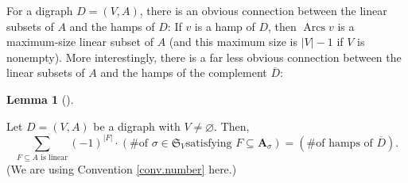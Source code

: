 \documentclass[numbers=enddot,12pt,final,onecolumn,notitlepage]{scrartcl}%
\numberwithin{exer}{section}
\theoremstyle{definition}
\newtheorem{lem}[theo]{Lemma}
\newenvironment{lemma}[1][]
{\begin{lem}[#1]\begin{leftbar}}
{\end{leftbar}\end{lem}}
\let\sumnonlimits\sum
\renewcommand{\sum}{\sumnonlimits\limits}
\begin{document}
For a digraph $D=\left(  V,A\right)  $, there is an obvious connection between
the linear subsets of $A$ and the hamps of $D$: If $v$ is a hamp of $D$, then
$\operatorname*{Arcs}v$ is a maximum-size linear subset of $A$ (and this
maximum size is $\left\vert V\right\vert -1$ if $V$ is nonempty). More
interestingly, there is a far less obvious connection between the linear
subsets of $A$ and the hamps of the complement $\overline{D}$:

\begin{lemma}
\label{lem.hamps-by-lin}Let $D=\left(  V,A\right)  $ be a digraph with
$V\neq\varnothing$. Then,%
\[
\sum_{F\subseteq A\text{ is linear}}\left(  -1\right)  ^{\left\vert
F\right\vert }\cdot\left(  \text{\# of }\sigma\in\mathfrak{S}_{V}\text{
satisfying }F\subseteq\mathbf{A}_{\sigma}\right)  =\left(  \text{\# of hamps
of }\overline{D}\right)  .
\]
(We are using Convention \ref{conv.number} here.)
\end{lemma}
\end{document}
